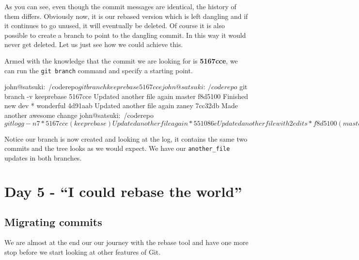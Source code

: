 
As you can see, even though the commit messages are identical, the history of them differs.
Obviously now, it is our rebased version which is left dangling and if it continues to go unused, it will eventually be deleted.
Of course it is also possible to create a branch to point to the dangling commit.
In this way it would never get deleted.
Let us just see how we could achieve this.

Armed with the knowledge that the commit we are looking for is \textbf{5167cce}, we can run the \texttt{git branch} command and specify a starting point.

\begin{code}
john@satsuki:~/coderepo$ git branch keeprebase 5167cce
john@satsuki:~/coderepo$ git branch -v
  keeprebase 5167cce Updated another file again
  master     f8d5100 Finished new dev
* wonderful  4d91aab Updated another file again
  zaney      7cc32db Made another awesome change
john@satsuki:~/coderepo$ git logg -n7
* 5167cce (keeprebase) Updated another file again
* 551086e Updated another file with 2 edits
* f8d5100 (master) Finished new dev
* 1968324 Start new dev
| * 4d91aab (HEAD, wonderful) Updated another file again
| * 1ffe37f Updated another file with 2 edits
|/
* 1c3206a Added a new file
john@satsuki:~/coderepo$
\end{code}


Notice our branch is now created and looking at the log, it contains the same two commits and the tree looks as we would expect.
We have our \texttt{another\_file} updates in both branches.

\section{Day 5 - ``I could rebase the world''}
\subsection{Migrating commits}
We are almost at the end our our journey with the rebase tool and have one more stop before we start looking at other features of Git.

